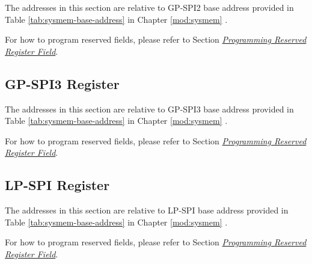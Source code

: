 \documentclass[main\_\_EN.tex]{subfiles}
\begin{document}
The addresses in this section are relative to GP-SPI2 base address provided in Table \ref{tab:sysmem-base-address} in Chapter \ref{mod:sysmem} \textit{}.

For how to program reserved fields, please refer to Section \hyperref[programming-reserved-field]{\textit{Programming Reserved Register Field}}.



\subsection{GP-SPI3 Register}

The addresses in this section are relative to GP-SPI3 base address provided in Table \ref{tab:sysmem-base-address} in Chapter \ref{mod:sysmem} \textit{}.

For how to program reserved fields, please refer to Section \hyperref[programming-reserved-field]{\textit{Programming Reserved Register Field}}.



\subsection{LP-SPI Register}

The addresses in this section are relative to LP-SPI base address provided in Table \ref{tab:sysmem-base-address} in Chapter \ref{mod:sysmem} \textit{}.

For how to program reserved fields, please refer to Section \hyperref[programming-reserved-field]{\textit{Programming Reserved Register Field}}.


\end{document}
